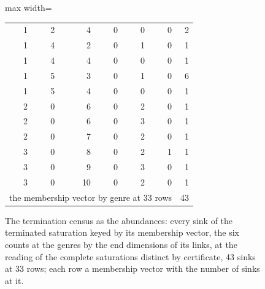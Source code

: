\begin{figure}[htbp]
\begin{adjustbox}{max width=\linewidth}
\begin{tabular}{|rrrrrr|r|}
1 & 2 & 4 & 0 & 0 & 0 & 2 \\
1 & 4 & 2 & 0 & 1 & 0 & 1 \\
1 & 4 & 4 & 0 & 0 & 0 & 1 \\
1 & 5 & 3 & 0 & 1 & 0 & 6 \\
1 & 5 & 4 & 0 & 0 & 0 & 1 \\
2 & 0 & 6 & 0 & 2 & 0 & 1 \\
2 & 0 & 6 & 0 & 3 & 0 & 1 \\
2 & 0 & 7 & 0 & 2 & 0 & 1 \\
3 & 0 & 8 & 0 & 2 & 1 & 1 \\
3 & 0 & 9 & 0 & 3 & 0 & 1 \\
3 & 0 & 10 & 0 & 2 & 0 & 1 \\
\hline
\multicolumn{6}{|l|}{the membership vector by genre at 33 rows} & 43 \\ \hline
\end{tabular}\end{adjustbox}
\caption{The termination census as the abundances: every sink of the terminated saturation keyed by its membership vector, the six counts at the genres by the end dimensions of its links, at the reading of the complete saturations distinct by certificate, 43 sinks at 33 rows; each row a membership vector with the number of sinks at it.}\label{fig:I-5-D543318-termination-census}
\end{figure}
